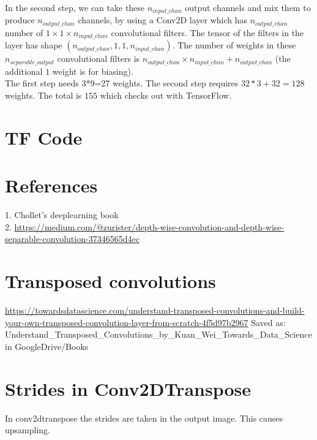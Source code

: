 \documentclass{article}
\begin{document}
In the second step, we can take these $n_{input\_chan}$ output channels and mix them to produce $n_{output\_chan}$ channels, by using a Conv2D layer which has $n_{output\_chan}$ number of $1\times1\times{n_{input\_chan}}$ convolutional filters. The tensor of the filters in the layer has shape $(n_{output\_chan},1,1,n_{input\_chan})$. The number of weights in these $n_{separable\_output}$ convolutional filters is $n_{output\_chan}\times{n_{input\_chan}}+n_{output\_chan}$ (the additional $1$ weight is for biasing).\\

The first step needs 3*9=27 weights. The second step requires $32*3+32=128$ weights. The total is $155$ which checks out with TensorFlow.

\section{TF Code}
\begin{center}
  
\end{center} 
\section{References}
1. Chollet's deeplearning book\\
2. \url{https://medium.com/@zurister/depth-wise-convolution-and-depth-wise-separable-convolution-37346565d4ec}


\section{Transposed convolutions}
\url{https://towardsdatascience.com/understand-transposed-convolutions-and-build-your-own-transposed-convolution-layer-from-scratch-4f5d97b2967}
Saved as: Understand\_Transposed\_Convolutions\_by\_Kuan\_Wei\_Towards\_Data\_Science in GoogleDrive/Books
\section{Strides in Conv2DTranspose}
In conv2dtranspose the strides are taken in the output image. This causes upsampling.
\end{document}
